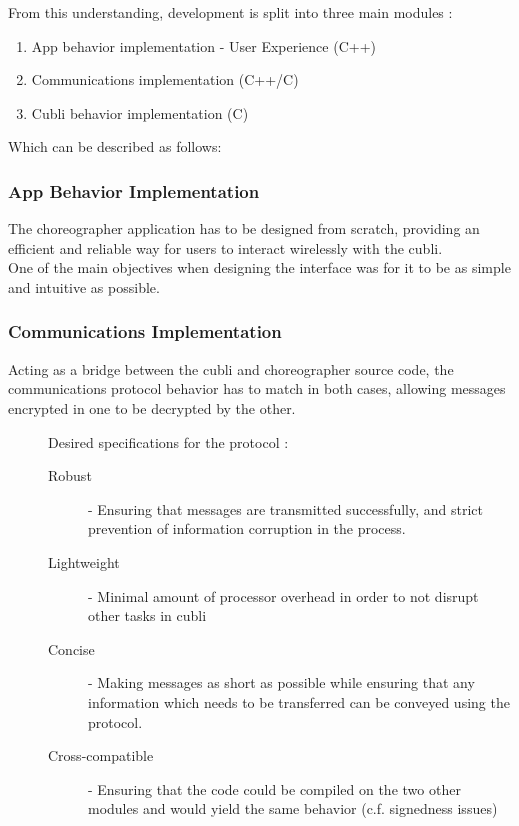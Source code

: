  From this understanding, development is split into three main modules :

\begin{enumerate}
\item App behavior implementation - User Experience (C++)  
\item Communications implementation  (C++/C)
\item Cubli behavior implementation  (C)  
\end{enumerate}
 
Which can be described as follows:

\subsubsection{App Behavior Implementation}

The choreographer application has to be designed from scratch, providing an efficient and reliable way for users to interact wirelessly with the cubli. \\

One of the main objectives when designing the interface was for it to be as simple and intuitive as possible.
 
\subsubsection{Communications Implementation}

Acting as a bridge between the cubli and choreographer source code, the communications protocol behavior has to match in both cases, allowing messages encrypted in one to be decrypted by the other.

\begin{description}
\item[] Desired specifications for the protocol :
\begin{description}
  \item[Robust] - Ensuring that messages are transmitted successfully, and    strict prevention of information corruption in the process. 

  \item[Lightweight] - Minimal amount of processor overhead in order to not disrupt other tasks in cubli 

  \item[Concise] - Making messages as short as possible while ensuring that 	any information which needs to be transferred can be conveyed using the 	protocol. 

  \item[Cross-compatible] - Ensuring that the code could be compiled on the 	two other modules and would yield the same behavior (c.f. signedness 	issues) 
\end{description}
\end{description}
 
